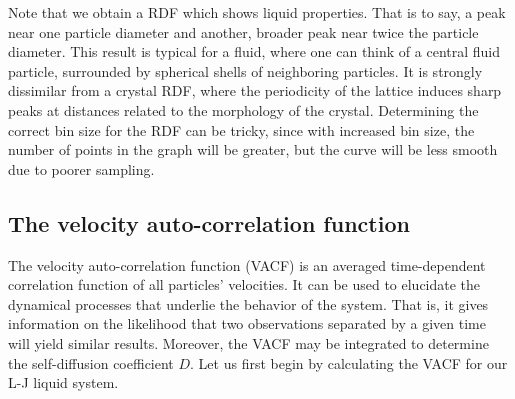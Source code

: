 \documentclass[
paper=a4,                       %
fontsize=11pt,                  %
twoside,                        %
footsepline,                    %
headsepline,                    %
headinclude=false,              %
footinclude=false,              %
pagesize,                       %
]{scrartcl}
\newtheorem{task}{Task}
\begin{document}
\noindent Note that we obtain a RDF which shows liquid properties. That is to say, a peak near one particle diameter and another, broader peak near twice the particle diameter. This result is typical for a fluid, where one can think of a central fluid particle, surrounded by spherical shells of neighboring particles. It is strongly dissimilar from a crystal RDF, where the periodicity of the lattice induces sharp peaks at distances related to the morphology of the crystal. Determining the correct bin size for the RDF can be tricky, since with increased bin size, the number of points in the graph will be greater, but the curve will be less smooth due to poorer sampling. 

\subsection{The velocity auto-correlation function}

The velocity auto-correlation function (VACF) is an averaged time-dependent correlation function of all particles' velocities. It can be used to elucidate the dynamical processes that underlie the behavior of the system. That is, it gives information on the likelihood that two observations separated by a given time will yield similar results. Moreover, the VACF may be integrated to determine the self-diffusion coefficient $D$. Let us first begin by calculating the VACF for our L-J liquid system.  

\vspace{1cm}
\vspace{1cm}
\end{document}
